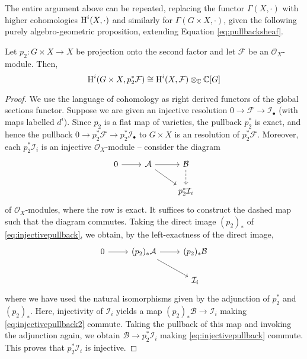 The entire argument above can be repeated, replacing the functor $\Gamma(X,\cdot)$ with
higher cohomologies $\operatorname{H}^i(X,\cdot)$ and similarly for $\Gamma(G\times X,\cdot)$, given
the following purely algebro-geometric proposition, extending Equation \ref{eq:pullbacksheaf}.

\begin{lemma}
    Let $p_2:G\times X\to X$ be projection onto the second factor and let $\mathcal{F}$ be an
    $\mathcal{O}_X$-module. Then,
    \begin{equation}
        \operatorname{H}^i(G\times X,p_2^*\mathcal{F}) \cong \operatorname{H}^i(X,\mathcal{F})\otimes_{\mathbb{C}}\mathbb{C}[G]
        \label{eq:pullbackcohomology}
    \end{equation}
\end{lemma}
\begin{proof}
    We use the language of cohomology as right derived functors of the global sections functor.
    Suppose we are given an injective resolution $0\to\mathcal{F}\to\mathcal{I}_\bullet$
    (with maps labelled $d^i$).
    Since $p_2$ is a flat map of varieties, the pullback $p_2^*$ is exact, and hence
    the pullback $0\to p_2^*\mathcal{F}\to p_2^*\mathcal{I}_\bullet$ to $G\times X$ is
    an resolution of $p_2^*\mathcal{F}$. Moreover, each $p_2^*\mathcal{I}_i$ is an injective
    $\mathcal{O}_X$-module -- consider the diagram
    \begin{equation}
        \begin{tikzcd}
            0\ar{r} & \mathcal{A}\ar{r}\ar{rd} & \mathcal{B}\ar[dashed]{d}\\
            & & p_2^*\mathcal{\mathcal{I}}_i
        \end{tikzcd}
        \label{eq:injectivepullback}
    \end{equation}
    of $\mathcal{O}_X$-modules, where the row is exact. It suffices to construct the dashed map such that the diagram commutes.
    Taking the direct image $(p_2)_*$ of \ref{eq:injectivepullback}, we obtain, by the left-exactness
    of the direct image,
    \begin{equation}
        \begin{tikzcd}
            0\ar{r} & (p_2)_*\mathcal{A}\ar{r}\ar{rd} & (p_2)_*\mathcal{B}\\
            & & \mathcal{\mathcal{I}}_i
        \end{tikzcd}
        \label{eq:injectivepullback2}
    \end{equation}
    where we have used the  natural isomorphisms given by the adjunction of $p_2^*$ and $(p_2)_*$.
    Here, injectivity of $\mathcal{I}_i$ yields a map $(p_2)_*\mathcal{B}\to \mathcal{I}_i$
    making \ref{eq:injectivepullback2} commute. Taking the pullback of this map and invoking
    the adjunction again, we obtain $\mathcal{B}\to p_2^*\mathcal{I}_i$ making \ref{eq:injectivepullback}
    commute. This proves that $p_2^*\mathcal{I}_i$ is injective.


\end{proof}
